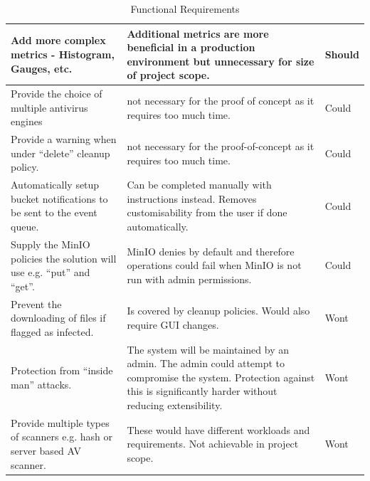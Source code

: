 \documentclass[12pt, conference, final, a4paper, onecolumn, compsoc]{IEEEtran}
\begin{document}
\begin{table}[H]
\begin{tabular}{|p{}|p{}|l|}
    Add more complex metrics - Histogram, Gauges, etc. & Additional metrics are
                                                        more beneficial in a production environment but unnecessary for size of project
                                                        scope. & Should \\ \hline \hline Provide the choice of multiple antivirus
    engines & not necessary for the proof of concept as it requires too much time. &
                                                                                     Could \\ \hline Provide a warning when under ``delete'' cleanup policy. & not
                                                                                                                                                              necessary for the proof-of-concept as it requires too much time. & Could \\
    \hline Automatically setup bucket notifications to be sent to the event queue. & Can be completed
                                                               manually with instructions instead. Removes customisability from the user if
                                                               done automatically. & Could \\ \hline Supply the MinIO policies the solution
    will use e.g. ``put'' and ``get''. & MinIO denies by default and therefore
                                         operations could fail when MinIO is not run with admin permissions. & Could \\
    \hline \hline

    Prevent the downloading of files if flagged as infected. & Is
                                                              covered by cleanup policies. Would also require GUI changes. & Wont \\ \hline
    Protection from ``inside man'' attacks. & The system will be maintained by an
                                             admin. The admin could attempt to compromise the system. Protection against this
                                             is significantly harder without reducing extensibility. & Wont \\ \hline Provide
    multiple types of scanners e.g. hash or server based AV scanner. & These would
                                                                      have different workloads and requirements. Not achievable in project scope. &
                                                                                                                                                    Wont \\ \hline
  \end{tabular}
  \caption{Functional Requirements}
  \label{tab:functional-reqs}
\end{table}
\end{document}
